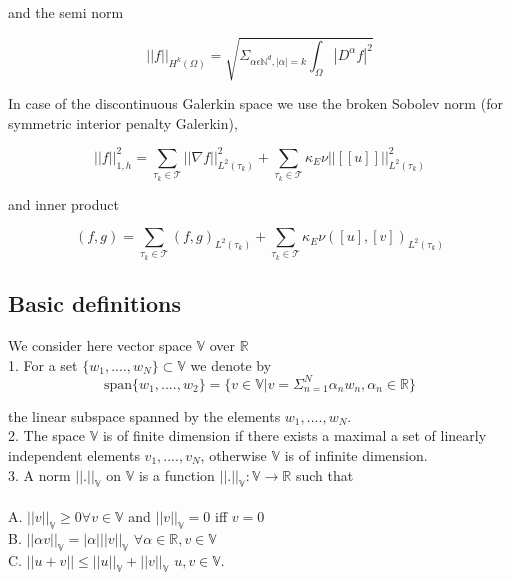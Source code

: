 \documentclass[a4paper,12pt]{book}
\begin{document}
and the semi norm 

\begin{equation}
||f||_{H^k (\Omega)} = \sqrt{\Sigma_{\alpha \epsilon \mathbb{N}^d, |\alpha| = k} \int_\Omega |D^\alpha f|^2}
\end{equation}

In case of the discontinuous Galerkin space we use the broken Sobolev norm (for symmetric interior penalty Galerkin), \cite{Montlaur2}

\begin{equation}
||f||_{1,h}^2 = \sum_{\tau_k \in \mathcal{T}} ||\nabla f||_{L^2(\tau_k)}^2 + \sum_{\tau_k \in \mathcal{T}} \kappa_E \nu ||[[u]]||_{L^2 (\tau_k)}^2
\end{equation}

and inner product

\begin{equation}
(f,g) = \sum_{\tau_k \in \mathcal{T}} (f,g)_{L^2(\tau_k)} + \sum_{\tau_k \in \mathcal{T}} \kappa_E \nu ([u],[v])_{L^2 (\tau_k)}
\end{equation}

\subsection{Basic definitions}\cite{crbm}

We consider here vector space $\mathbb{V}$ over $\mathbb{R}$\\

1. For a set $\lbrace w_1,....,w_N \rbrace \subset \mathbb{V}$ we denote by \\
\begin{equation} \label{vector space}
\mathrm{span} \lbrace w_1,....,w_2 \rbrace = \lbrace v \in \mathbb{V} | v = \Sigma_{n=1}^N \alpha_n w_n, \alpha_n \in \mathbb{R} \rbrace
\end{equation} 

the linear subspace spanned by the elements $w_1,....,w_N$.\\

2. The space $\mathbb{V}$ is of finite dimension if there exists a maximal a set of linearly independent elements $v_1,....,v_N$, otherwise $\mathbb{V}$ is of infinite dimension.\\

3. A norm $||.||_\mathbb{V}$ on $\mathbb{V}$ is a function $||.||_\mathbb{V} : \mathbb{V} \rightarrow \mathbb{R}$ such that\\ 
\\
A. $||v||_\mathbb{V} \geq 0 \forall v \in \mathbb{V}$ and $||v||_\mathbb{V} = 0$ iff $v=0$\\
B. $||\alpha v||_\mathbb{V} = |\alpha| ||v||_\mathbb{V}$  $\forall \alpha \in \mathbb{R}, v \in \mathbb{V}$\\
C. $||u+v|| \leq ||u||_\mathbb{V} + ||v||_\mathbb{V}$ $u,v \in \mathbb{V}$.\\
\end{document}
